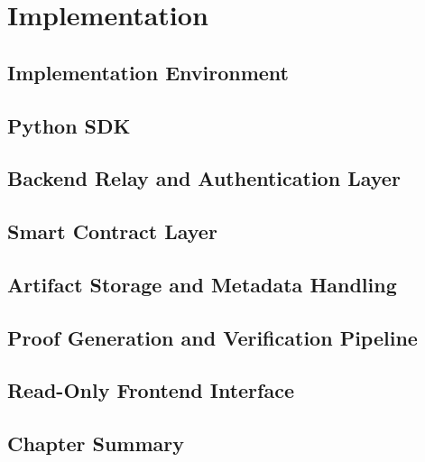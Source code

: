 \chapter{Implementation}
\section{Implementation Environment}
\section{Python SDK}
\section{Backend Relay and Authentication Layer}
\section{Smart Contract Layer}
\section{Artifact Storage and Metadata Handling}
\section{Proof Generation and Verification Pipeline}
\section{Read-Only Frontend Interface}
\section{Chapter Summary}
